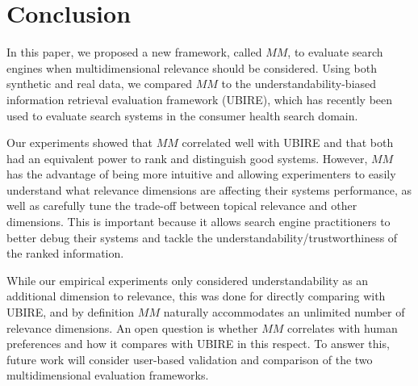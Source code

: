 
\section{Conclusion}
\label{sec:conclusion}

In this paper, we proposed a new framework, called $MM$, to evaluate search engines when multidimensional relevance should be considered.
Using both synthetic and real data, we compared $MM$ to the understandability-biased information retrieval evaluation framework (UBIRE), which has recently been used  to evaluate search systems in the consumer health search domain. 

Our experiments showed that $MM$ correlated well with UBIRE and that both had an equivalent power to rank and distinguish good systems. However, $MM$ has the advantage of being more intuitive and allowing experimenters to easily understand what relevance dimensions are affecting their systems performance, as well as carefully tune the trade-off between topical relevance and other dimensions. This is important because it allows search engine practitioners to better debug their systems and tackle the understandability/trustworthiness of the ranked information.

 While our empirical experiments only considered understandability as an additional dimension to relevance, this was done for directly comparing with UBIRE, and by definition $MM$ naturally accommodates an unlimited number of relevance dimensions. An open question is whether $MM$ correlates with human preferences and how it compares with UBIRE in this respect. To answer this, future work will consider user-based validation and comparison of the two multidimensional evaluation frameworks. 
